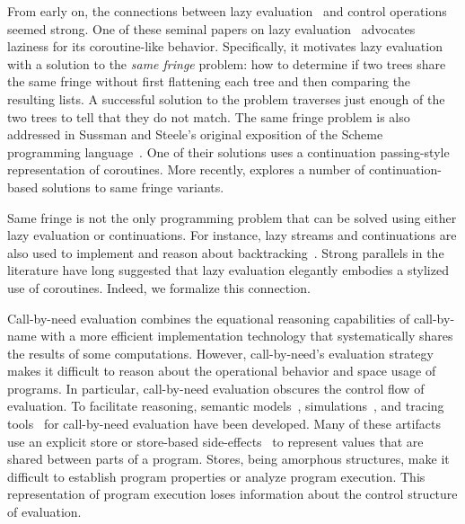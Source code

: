 \documentclass{LMCS}
\theoremstyle{plain}
\theoremstyle{remark}
\newcommand{\topic}[1]{}
\begin{document}
\topic{Laziness and Control}
From early on, the connections between lazy
evaluation~\cite{friedman76cons,henderson76lazy} and control operations seemed
strong. One of these seminal papers on lazy evaluation~\cite{henderson76lazy}
advocates laziness for its coroutine-like behavior. Specifically, it motivates
lazy evaluation with a solution to the \emph{same fringe} problem: how to
determine if two trees share the same fringe without first flattening each tree
and then comparing the resulting lists.  A successful solution to the problem
traverses just enough of the two trees to tell that they do not match.  The
same fringe problem is also addressed in Sussman and Steele's original
exposition of the Scheme programming language~\cite{sussman98scheme}. One of
their solutions uses a continuation passing-style representation of coroutines.
More recently, \citet{Biernacki20057} explores a number of continuation-based
solutions to same fringe variants.

Same fringe is not the only programming problem that can be solved using either
lazy evaluation or continuations.  For instance, lazy streams and continuations
are also used to implement and reason about
backtracking~\cite{wand04backtracking,kiselyov05backtracking}.  Strong
parallels in the literature have long suggested that lazy evaluation elegantly
embodies a stylized use of coroutines. Indeed, we formalize this connection.



\topic{Reasoning about Call-by-need}
Call-by-need evaluation combines the equational reasoning capabilities of
call-by-name with a more efficient implementation technology that
systematically shares the results of some computations.  However,
call-by-need's evaluation strategy makes it difficult to reason about the
operational behavior and space usage of programs.  In particular, call-by-need
evaluation obscures the control flow of evaluation.  To facilitate reasoning,
semantic
models~\cite{launchbury93natural,sestoft97machine,friedman07krivine,nakata10need},
simulations~\cite{OKASAKI94}, and tracing tools~\cite{gibbons96tracing} for
call-by-need evaluation have been developed.
Many of these artifacts use an explicit store or store-based
side-effects~\cite{wang90lazy} to represent values that are shared between
parts of a program.  Stores, being amorphous structures, make it difficult to
establish program properties or analyze program execution.  This representation
of program execution loses information about the control structure of
evaluation. 
 
\end{document}
